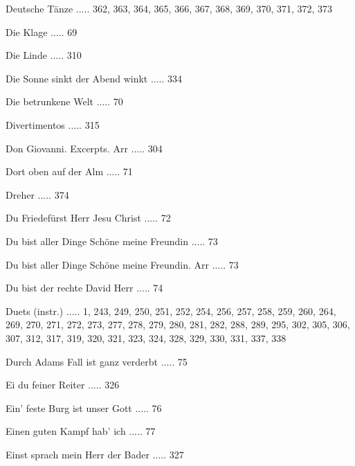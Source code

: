 \documentclass[twocolumn]{book}
\begin{document}
\newline 
Deutsche Tänze ..... 362, 363, 364, 365, 366, 367, 368, 369, 370, 371, 372, 373

\newline 
Die Klage ..... 69

\newline 
Die Linde ..... 310

\newline 
Die Sonne sinkt der Abend winkt ..... 334

\newline 
Die betrunkene Welt ..... 70

\newline 
Divertimentos ..... 315

\newline 
Don Giovanni. Excerpts. Arr ..... 304

\newline 
Dort oben auf der Alm ..... 71

\newline 
Dreher ..... 374

\newline 
Du Friedefürst Herr Jesu Christ ..... 72

\newline 
Du bist aller Dinge Schöne meine Freundin ..... 73

\newline 
Du bist aller Dinge Schöne meine Freundin. Arr ..... 73

\newline 
Du bist der rechte David Herr ..... 74

\newline 
Duets (instr.) ..... 1, 243, 249, 250, 251, 252, 254, 256, 257, 258, 259, 260, 264, 269, 270, 271, 272, 273, 277, 278, 279, 280, 281, 282, 288, 289, 295, 302, 305, 306, 307, 312, 317, 319, 320, 321, 323, 324, 328, 329, 330, 331, 337, 338

\newline 
Durch Adams Fall ist ganz verderbt ..... 75

\newline 
Ei du feiner Reiter ..... 326

\newline 
Ein' feste Burg ist unser Gott ..... 76

\newline 
Einen guten Kampf hab' ich ..... 77

\newline 
Einst sprach mein Herr der Bader ..... 327
\end{document}
